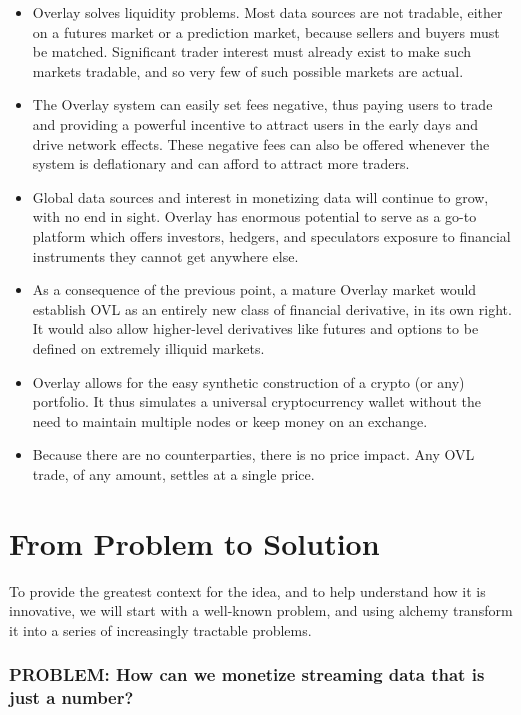 \documentclass[11pt]{article}
\providecommand{\tightlist}{%
      \setlength{\itemsep}{0pt}\setlength{\parskip}{0pt}}
\begin{document}
\begin{itemize}
\tightlist
\item
  Overlay solves liquidity problems. Most data sources are not tradable,
  either on a futures market or a prediction market, because sellers and
  buyers must be matched. Significant trader interest must already exist
  to make such markets tradable, and so very few of such possible
  markets are actual.
\item
  The Overlay system can easily set fees negative, thus paying users to
  trade and providing a powerful incentive to attract users in the early
  days and drive network effects. These negative fees can also be
  offered whenever the system is deflationary and can afford to attract
  more traders.
\item
  Global data sources and interest in monetizing data will continue to
  grow, with no end in sight. Overlay has enormous potential to serve as
  a go-to platform which offers investors, hedgers, and speculators
  exposure to financial instruments they cannot get anywhere else.
\item
  As a consequence of the previous point, a mature Overlay market would
  establish OVL as an entirely new class of financial derivative, in its
  own right. It would also allow higher-level derivatives like futures
  and options to be defined on extremely illiquid markets.
\item
  Overlay allows for the easy synthetic construction of a crypto (or
  any) portfolio. It thus simulates a universal cryptocurrency wallet
  without the need to maintain multiple nodes or keep money on an
  exchange.
\item
  Because there are no counterparties, there is no price impact. Any OVL
  trade, of any amount, settles at a single price.
\end{itemize}

    \section{From Problem to Solution}\label{from-problem-to-solution}

    To provide the greatest context for the idea, and to help understand how
it is innovative, we will start with a well-known problem, and using
alchemy transform it into a series of increasingly tractable problems.

    \subsubsection{\texorpdfstring{PROBLEM: How can we monetize streaming
data that is just a
number?}{PROBLEM:  How can we monetize streaming data that is just a number?}}\label{problem-how-can-we-monetize-streaming-data-that-is-just-a-number}
\end{document}
